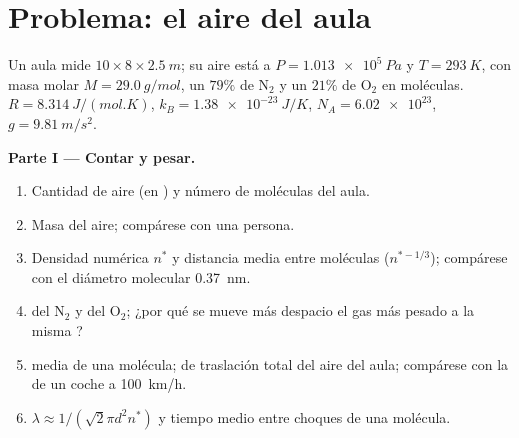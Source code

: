 \section{Problema: el aire del aula}

\begin{problem}
\label{pb:b1:kinetic-theory:1}
Un aula mide $10 \times 8 \times \qty{2.5}{m}$; su aire está a
$P = \qty{1.013e5}{Pa}$ y $T = \qty{293}{K}$, con masa molar
$M = \qty{29.0}{g/mol}$, un $79\%$ de N$_2$ y un $21\%$ de O$_2$ en
moléculas. $R = \qty{8.314}{J/(mol.K)}$,
$k_B = \qty{1.38e-23}{J/K}$, $N_A = \num{6.02e23}$, $g = \qty{9.81}{m/s^2}$.

\medskip
\noindent\textbf{Parte I --- Contar y pesar.}
\begin{enumerate}
  \item Cantidad de aire (en ) y número de moléculas del aula.
  \item Masa del aire; compárese con una persona.
  \item Densidad numérica $n^*$ y distancia media entre moléculas
        ($n^{*-1/3}$); compárese con el diámetro molecular \qty{0.37}{nm}.
  \item {} del N$_2$ y del O$_2$; ¿por qué se mueve
        más despacio el gas más pesado a la misma ?
  \item {} media de una molécula;  de
        traslación total del aire del aula; compárese con la  de un coche a \qty{100}{km/h}.
  \item {} $\lambda \approx 1/(\sqrt2\pi d^2n^*)$ y tiempo
        medio entre choques de una molécula.
\end{enumerate}


\end{problem}
